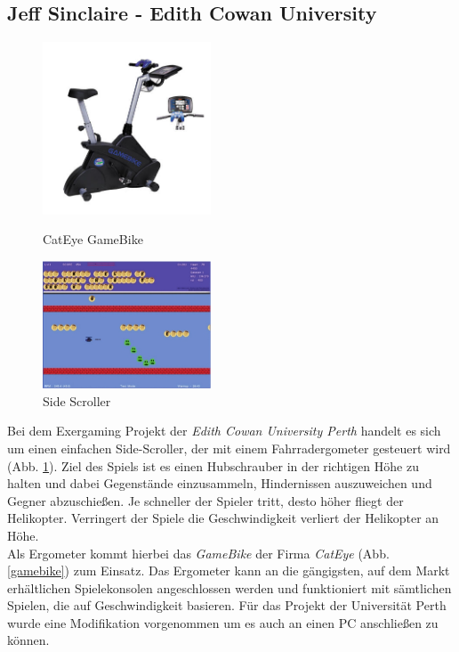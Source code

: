 \subsection{Jeff Sinclaire - Edith Cowan University}
\begin{figure}[ht]
	\centering
	\begin{minipage}[b]{6 cm}
		\includegraphics[width=5cm]{gfx/recherche/cateye.jpg} 
			\caption{CatEye GameBike}
			\label{gamebike}
	\end{minipage}
	\begin{minipage}[b]{6 cm}
			\includegraphics[width=5cm]{gfx/recherche/edith.jpg}  
			\caption{Side Scroller}
			\label{sidescroller}
	\end{minipage}
\end{figure}\noindent
Bei dem Exergaming Projekt der \textit{Edith Cowan University Perth} \cite{5716909} handelt es sich um einen einfachen Side-Scroller, der mit einem Fahrradergometer gesteuert wird (Abb. \ref{sidescroller}). Ziel des Spiels ist es einen Hubschrauber in der richtigen Höhe zu halten und dabei Gegenstände einzusammeln, Hindernissen auszuweichen und Gegner abzuschießen. Je schneller der Spieler tritt, desto höher fliegt der Helikopter. Verringert der Spiele die Geschwindigkeit verliert der Helikopter an Höhe.\\
Als Ergometer kommt hierbei das \textit{GameBike} der Firma \textit{CatEye} (Abb. \ref{gamebike}) zum Einsatz. Das Ergometer kann an die gängigsten, auf dem Markt erhältlichen Spielekonsolen angeschlossen werden und funktioniert mit sämtlichen Spielen, die auf Geschwindigkeit basieren. Für das Projekt der Universität Perth wurde eine Modifikation vorgenommen um es auch an einen PC anschließen zu können.



